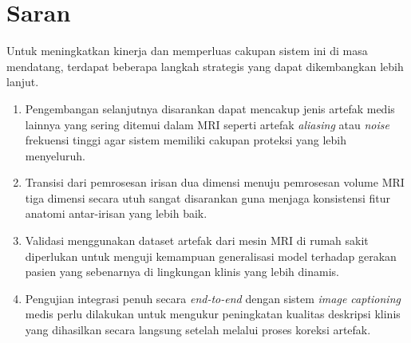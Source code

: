 \section{Saran}

Untuk meningkatkan kinerja dan memperluas cakupan sistem ini di masa mendatang, terdapat beberapa langkah strategis yang dapat dikembangkan lebih lanjut.

\begin{enumerate}[nolistsep]

  \item Pengembangan selanjutnya disarankan dapat mencakup jenis artefak medis lainnya yang sering ditemui dalam MRI seperti artefak \textit{aliasing} atau \textit{noise} frekuensi tinggi agar sistem memiliki cakupan proteksi yang lebih menyeluruh.

  \item Transisi dari pemrosesan irisan dua dimensi menuju pemrosesan volume MRI tiga dimensi secara utuh sangat disarankan guna menjaga konsistensi fitur anatomi antar-irisan yang lebih baik.

  \item Validasi menggunakan dataset artefak dari mesin MRI di rumah sakit diperlukan untuk menguji kemampuan generalisasi model terhadap gerakan pasien yang sebenarnya di lingkungan klinis yang lebih dinamis.
  
  \item Pengujian integrasi penuh secara \textit{end-to-end} dengan sistem \textit{image captioning} medis perlu dilakukan untuk mengukur peningkatan kualitas deskripsi klinis yang dihasilkan secara langsung setelah melalui proses koreksi artefak.

\end{enumerate}
